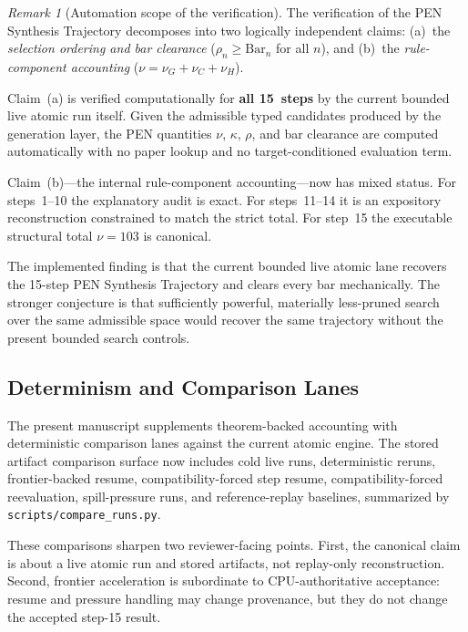 \documentclass[11pt,a4paper]{article}
\theoremstyle{plain}
\theoremstyle{definition}
\theoremstyle{remark}
\newtheorem{remark}[theorem]{Remark}
\begin{document}
\begin{remark}[Automation scope of the verification]
\label{rem:automation-scope}
The verification of the PEN Synthesis Trajectory decomposes into two logically independent claims: (a)~the \emph{selection ordering and bar clearance} ($\rho_n \ge \mathrm{Bar}_n$ for all $n$), and (b)~the \emph{rule-component accounting} ($\nu = \nu_G + \nu_C + \nu_H$).

Claim~(a) is verified computationally for \textbf{all 15~steps} by the current bounded live atomic run itself.
Given the admissible typed candidates produced by the generation layer, the PEN quantities $\nu$, $\kappa$, $\rho$, and bar clearance are computed automatically with no paper lookup and no target-conditioned evaluation term.

\noindent Claim~(b)---the internal rule-component accounting---now has mixed status.
For steps~1--10 the explanatory audit is exact.
For steps~11--14 it is an expository reconstruction constrained to match the strict total.
For step~15 the executable structural total $\nu = 103$ is canonical.

The implemented finding is that the current bounded live atomic lane recovers the 15-step PEN Synthesis Trajectory and clears every bar mechanically.
The stronger conjecture is that sufficiently powerful, materially less-pruned search over the same admissible space would recover the same trajectory without the present bounded search controls.
\end{remark}

\subsection{Determinism and Comparison Lanes}

The present manuscript supplements theorem-backed accounting with deterministic comparison lanes against the current atomic engine.
The stored artifact comparison surface now includes cold live runs, deterministic reruns, frontier-backed resume, compatibility-forced step resume, compatibility-forced reevaluation, spill-pressure runs, and reference-replay baselines, summarized by \texttt{scripts/compare\_runs.py}.

These comparisons sharpen two reviewer-facing points.
First, the canonical claim is about a live atomic run and stored artifacts, not replay-only reconstruction.
Second, frontier acceleration is subordinate to CPU-authoritative acceptance: resume and pressure handling may change provenance, but they do not change the accepted step-15 result.
\end{document}
